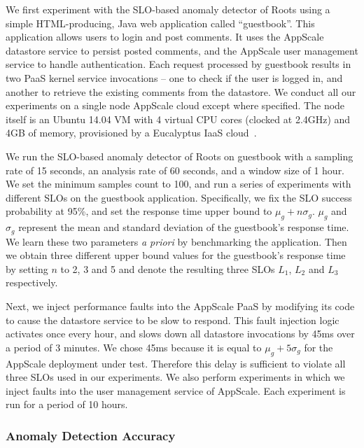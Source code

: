 We first experiment with the SLO-based anomaly detector of Roots
using a simple HTML-producing, Java 
web application called ``guestbook''.
This application allows users to login and post comments. It uses the
AppScale  datastore service to persist
posted comments, and the AppScale user management service to handle authentication. 
Each request processed
by guestbook results in two PaaS kernel service
invocations -- one to check if the user is logged in, and 
another to retrieve the existing comments from the datastore. We conduct all
our experiments on a single node AppScale cloud except where specified. The node itself is an Ubuntu
14.04 VM with 4 virtual CPU cores (clocked at 2.4GHz) and 4GB of memory, provisioned by
a Eucalyptus IaaS cloud~\cite{eucalyptus09}.

We run the SLO-based anomaly detector of Roots on guestbook with a sampling rate of 15 seconds, an analysis
rate of 60 seconds, and a window size of 1 hour. We set the minimum samples count to 100, and
run a series of experiments with different SLOs on the guestbook application. Specifically, we fix
the SLO success probability at 95\%, and set the response time upper bound to $\mu_g + n\sigma_g$. 
$\mu_g$ and $\sigma_g$ represent the mean and standard deviation of the
guestbook's response time. We learn these two parameters \textit{a priori} by benchmarking
the application. Then we obtain three different upper bound values for the guestbook's
response time by setting 
$n$ to 2, 3 and 5 and denote the resulting three SLOs $L_1$, $L_2$ and $L_3$ respectively.

Next, we inject performance faults into the AppScale PaaS by modifying its code
to cause the datastore service to be slow to respond.
This fault injection logic activates once every hour, and
slows down all datastore invocations by 45ms over a period of 3 minutes.
We chose 45ms because it is equal 
to $\mu_g + 5\sigma_g$ for the AppScale deployment under test. 
Therefore this delay is sufficient to violate all three SLOs used in our experiments. 
We also perform experiments in which we inject faults into the user management service of
AppScale. Each experiment is run for a period of 10 hours.

\subsubsection{Anomaly Detection Accuracy}

